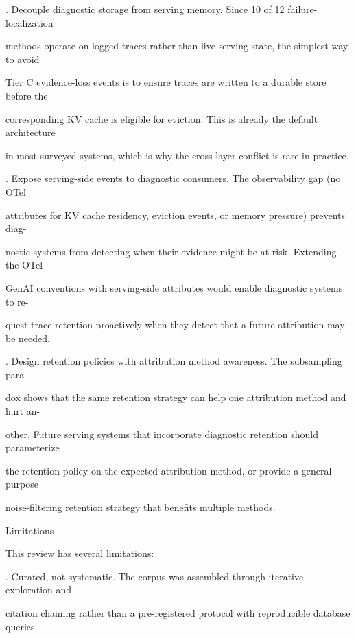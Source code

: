 \begin{flushleft}
. Decouple diagnostic storage from serving memory. Since 10 of 12 failure-localization\par
\noindent  methods operate on logged traces rather than live serving state, the simplest way to avoid\par
\noindent  Tier C evidence-loss events is to ensure traces are written to a durable store before the\par
\noindent  corresponding KV cache is eligible for eviction. This is already the default architecture\par
\noindent  in most surveyed systems, which is why the cross-layer conflict is rare in practice.\par
{}. Expose serving-side events to diagnostic consumers. The observability gap (no OTel\par
\noindent  attributes for KV cache residency, eviction events, or memory pressure) prevents diag-\par
\noindent  nostic systems from detecting when their evidence might be at risk. Extending the OTel\par
\noindent  GenAI conventions with serving-side attributes would enable diagnostic systems to re-\par
\noindent  quest trace retention proactively when they detect that a future attribution may be needed.\par
{}. Design retention policies with attribution method awareness. The subsampling para-\par
\noindent  dox shows that the same retention strategy can help one attribution method and hurt an-\par
\noindent  other. Future serving systems that incorporate diagnostic retention should parameterize\par
\noindent  the retention policy on the expected attribution method, or provide a general-purpose\par
\noindent  noise-filtering retention strategy that benefits multiple methods.\par
\par\smallskip
{} Limitations\par
\noindent This review has several limitations:\par
{}. Curated, not systematic. The corpus was assembled through iterative exploration and\par
\noindent  citation chaining rather than a pre-registered protocol with reproducible database queries.\par

\end{flushleft}
